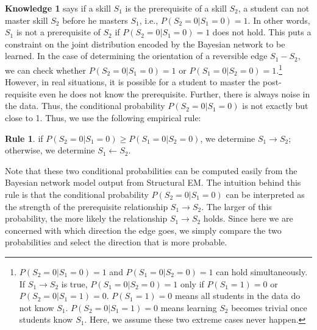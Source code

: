 \documentclass{edm_template}
\begin{document}
\textbf{Knowledge 1} says if a skill $S_1$ is the prerequisite of a skill $S_2$,
a student can not master skill $S_2$ before he masters $S_1$, i.e., $P(S_2=0|S_1=0)=1$.
In other words, $S_1$ is not a prerequisite of $S_2$ if $P(S_2=0|S_1=0)=1$ does not hold.
This puts a constraint on the joint distribution encoded by the Bayesian network to be learned.
In the case of determining the orientation of a reversible edge $S_1 - S_2$, we can check whether $P(S_2=0|S_1=0)=1$ or $P(S_1=0|S_2=0)=1$.\footnote{$P(S_2=0|S_1=0)=1$ and $P(S_1=0|S_2=0)=1$ can hold simultaneously. If $S_1\rightarrow S_2$ is true, $P(S_1=0|S_2=0)=1$ only if $P(S_1=1)=0$ or $P(S_2=0|S_1=1)=0$. $P(S_1=1)=0$ means all students in the data do not know $S_1$. $P(S_2=0|S_1=1)=0$ means learning $S_2$ becomes trivial once students know $S_1$. Here, we assume these two extreme cases never happen.} 
However, in real situations, it is possible for a student to master the post-requisite even he does not know the prerequisite. 
Further, there is always noise in the data. Thus, the conditional probability $P(S_2=0|S_1=0)$ is not exactly but close to 1.
Thus, we use the following empirical rule: 

\textbf{Rule 1}. if $P(S_2=0|S_1=0)\ge P(S_1=0|S_2=0)$, we determine $S_1\rightarrow S_2$; otherwise, we determine $S_1\leftarrow S_2$.

Note that these two conditional probabilities can be computed easily from the Bayesian network model output from Structural EM. 
The intuition behind this rule is that the conditional probability $P(S_2=0|S_1=0)$ can be interpreted as the strength of the prerequisite relationship $S_1\rightarrow S_2$.
The larger of this probability, the more likely the relationship $S_1\rightarrow S_2$ holds.
Since here we are concerned with which direction the edge goes, we simply compare the two probabilities and select the direction that is more probable. 
\end{document}
